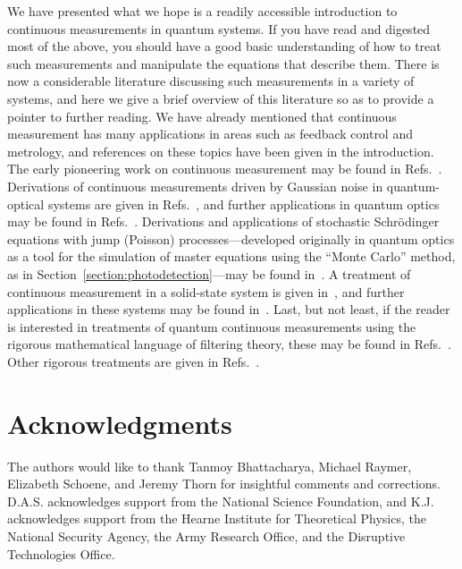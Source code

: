 \documentclass[aps,twocolumn,superscriptaddress,footinbib,floatfix,showpacs]{revtex4}
\begin{document}
We have presented what we hope is a readily accessible introduction to
continuous measurements in quantum systems.  If you have read and
digested most of the above, you should have a good basic understanding
of how to treat such measurements and manipulate the equations that
describe them.  There is now a considerable literature discussing such
measurements in a variety of systems, and here we give a brief
overview of this literature so as to provide a pointer to further
reading.  We have already mentioned that continuous measurement has
many applications in areas such as feedback control and metrology, and
references on these topics have been given in the introduction.  The
early pioneering work on continuous measurement may be found in
Refs.~\cite{Srinivas81,Barchielli82, Gisin84, Barchielli85, Diosi86,
BelavkinLQG, Diosi88, Belavkin89}.  Derivations of continuous
measurements driven by Gaussian noise in quantum-optical systems are
given in Refs.~\cite{Carmichael89, Wiseman93, DJ}, and further
applications in quantum optics may be found in Refs.~\cite{Wiseman93c,
Carm93, Garraway94, Wiseman95, Wiseman96, Plenio98, WisemanLinQ}.
Derivations and applications of stochastic Schr\"{o}dinger equations
with jump (Poisson) processes---developed originally in quantum optics
as a tool for the simulation of master equations using the ``Monte
Carlo'' method, as in Section~\ref{section:photodetection}---may be
found in~\cite{Zoller87, Hegerfeldt91, Holland91, Dalibard92,
Gardiner92, PlenioPhD, Hegerfeldt96, Garraway94, Holland96, Plenio98}.
A treatment of continuous measurement in a solid-state system is
given in~\cite{Korotkov}, and further applications in these systems
may be found in~\cite{Goan01, Hopkins03, Brun03, Santamore04,
Ruskov05, Sarovar05, Jordan06}.  Last, but not least, if the reader is
interested in treatments of quantum continuous measurements using the
rigorous mathematical language of filtering theory, these may be found
in Refs.~\cite{Bouten06, Belavkin93, Belavkin94, BelavkinLQG}.  Other
rigorous treatments are given in Refs.~\cite{Barchielli85,
Barchielli93}.

\section{Acknowledgments}

The authors would like to thank Tanmoy Bhattacharya, Michael Raymer,
Elizabeth Schoene,
and Jeremy Thorn for insightful comments and corrections.
D.A.S. acknowledges support from the National Science Foundation, and 
K.J. acknowledges support from the Hearne Institute for Theoretical 
Physics, the National Security Agency, the Army
Research Office, and the Disruptive Technologies Office. 
\end{document}
